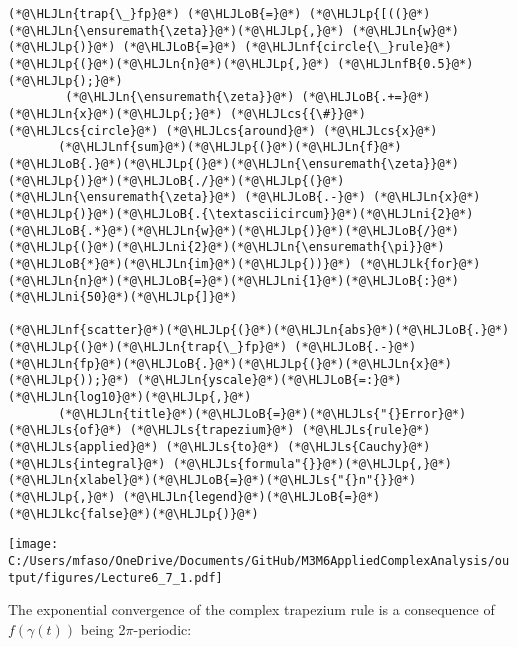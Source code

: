 \documentclass[12pt,a4paper]{article}
\newcommand{\HLJLk}[1]{\textcolor[RGB]{148,91,176}{\textbf{#1}}}
\newcommand{\HLJLkc}[1]{\textcolor[RGB]{59,151,46}{\textit{#1}}}
\newcommand{\HLJLn}[1]{#1}
\newcommand{\HLJLnf}[1]{\textcolor[RGB]{66,102,213}{#1}}
\newcommand{\HLJLs}[1]{\textcolor[RGB]{201,61,57}{#1}}
\newcommand{\HLJLnfB}[1]{\textcolor[RGB]{59,151,46}{#1}}
\newcommand{\HLJLni}[1]{\textcolor[RGB]{59,151,46}{#1}}
\newcommand{\HLJLoB}[1]{\textcolor[RGB]{102,102,102}{\textbf{#1}}}
\newcommand{\HLJLp}[1]{#1}
\newcommand{\HLJLcs}[1]{\textcolor[RGB]{153,153,119}{\textit{#1}}}
\begin{document}
\begin{lstlisting}
(*@\HLJLn{trap{\_}fp}@*) (*@\HLJLoB{=}@*) (*@\HLJLp{[((}@*)(*@\HLJLn{\ensuremath{\zeta}}@*)(*@\HLJLp{,}@*) (*@\HLJLn{w}@*)(*@\HLJLp{)}@*) (*@\HLJLoB{=}@*) (*@\HLJLnf{circle{\_}rule}@*)(*@\HLJLp{(}@*)(*@\HLJLn{n}@*)(*@\HLJLp{,}@*) (*@\HLJLnfB{0.5}@*)(*@\HLJLp{);}@*)
        (*@\HLJLn{\ensuremath{\zeta}}@*) (*@\HLJLoB{.+=}@*) (*@\HLJLn{x}@*)(*@\HLJLp{;}@*) (*@\HLJLcs{{\#}}@*) (*@\HLJLcs{circle}@*) (*@\HLJLcs{around}@*) (*@\HLJLcs{x}@*)
       (*@\HLJLnf{sum}@*)(*@\HLJLp{(}@*)(*@\HLJLn{f}@*)(*@\HLJLoB{.}@*)(*@\HLJLp{(}@*)(*@\HLJLn{\ensuremath{\zeta}}@*)(*@\HLJLp{)}@*)(*@\HLJLoB{./}@*)(*@\HLJLp{(}@*)(*@\HLJLn{\ensuremath{\zeta}}@*) (*@\HLJLoB{.-}@*) (*@\HLJLn{x}@*)(*@\HLJLp{)}@*)(*@\HLJLoB{.{\textasciicircum}}@*)(*@\HLJLni{2}@*) (*@\HLJLoB{.*}@*)(*@\HLJLn{w}@*)(*@\HLJLp{)}@*)(*@\HLJLoB{/}@*)(*@\HLJLp{(}@*)(*@\HLJLni{2}@*)(*@\HLJLn{\ensuremath{\pi}}@*)(*@\HLJLoB{*}@*)(*@\HLJLn{im}@*)(*@\HLJLp{))}@*) (*@\HLJLk{for}@*) (*@\HLJLn{n}@*)(*@\HLJLoB{=}@*)(*@\HLJLni{1}@*)(*@\HLJLoB{:}@*)(*@\HLJLni{50}@*)(*@\HLJLp{]}@*)

(*@\HLJLnf{scatter}@*)(*@\HLJLp{(}@*)(*@\HLJLn{abs}@*)(*@\HLJLoB{.}@*)(*@\HLJLp{(}@*)(*@\HLJLn{trap{\_}fp}@*) (*@\HLJLoB{.-}@*) (*@\HLJLn{fp}@*)(*@\HLJLoB{.}@*)(*@\HLJLp{(}@*)(*@\HLJLn{x}@*)(*@\HLJLp{));}@*) (*@\HLJLn{yscale}@*)(*@\HLJLoB{=:}@*)(*@\HLJLn{log10}@*)(*@\HLJLp{,}@*)
       (*@\HLJLn{title}@*)(*@\HLJLoB{=}@*)(*@\HLJLs{"{}Error}@*) (*@\HLJLs{of}@*) (*@\HLJLs{trapezium}@*) (*@\HLJLs{rule}@*) (*@\HLJLs{applied}@*) (*@\HLJLs{to}@*) (*@\HLJLs{Cauchy}@*) (*@\HLJLs{integral}@*) (*@\HLJLs{formula"{}}@*)(*@\HLJLp{,}@*) (*@\HLJLn{xlabel}@*)(*@\HLJLoB{=}@*)(*@\HLJLs{"{}n"{}}@*)(*@\HLJLp{,}@*) (*@\HLJLn{legend}@*)(*@\HLJLoB{=}@*)(*@\HLJLkc{false}@*)(*@\HLJLp{)}@*)
\end{lstlisting}

\texttt{[image: C:/Users/mfaso/OneDrive/Documents/GitHub/M3M6AppliedComplexAnalysis/output/figures/Lecture6\_7\_1.pdf]}

The exponential convergence of the complex trapezium rule is a consequence of $f(\gamma(t))$ being 2\ensuremath{\pi}-periodic:
\end{document}
